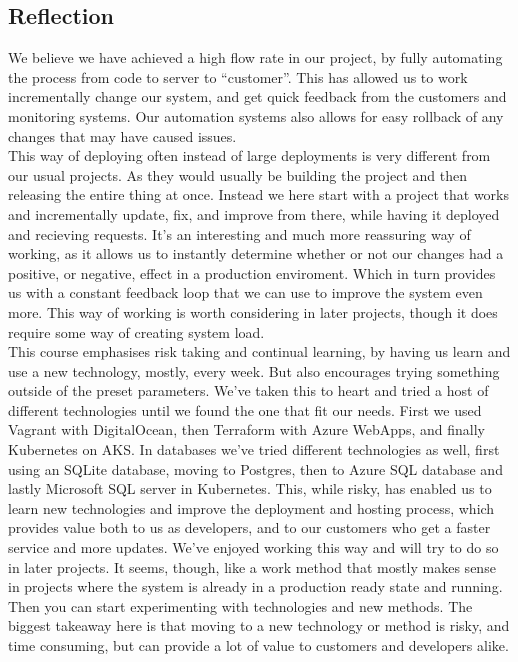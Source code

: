 \subsection{Reflection}
We believe we have achieved a high flow rate in our project, by fully automating the process from code to server to ``customer''.
This has allowed us to work incrementally change our system, and get quick feedback from the customers and monitoring systems.
Our automation systems also allows for easy rollback of any changes that may have caused issues.\\

This way of deploying often instead of large deployments is very different from our usual projects. As they would usually be building the project and then releasing the entire thing at once.
Instead we here start with a project that works and incrementally update, fix, and improve from there, while having it deployed and recieving requests.
It's an interesting and much more reassuring way of working, as it allows us to instantly determine whether or not our changes had a positive, or negative, effect in a production enviroment.
Which in turn provides us with a constant feedback loop that we can use to improve the system even more.
This way of working is worth considering in later projects, though it does require some way of creating system load.\\

This course emphasises risk taking and continual learning, by having us learn and use a new technology, mostly, every week.
But also encourages trying something outside of the preset parameters.
We've taken this to heart and tried a host of different technologies until we found the one that fit our needs. First we used Vagrant with DigitalOcean, then Terraform with Azure WebApps, and finally Kubernetes on AKS.
In databases we've tried different technologies as well, first using an SQLite database, moving to Postgres, then to Azure SQL database and lastly Microsoft SQL server in Kubernetes.
This, while risky, has enabled us to learn new technologies and improve the deployment and hosting process, which provides value both to us as developers, and to our customers who get a faster service and more updates.
We've enjoyed working this way and will try to do so in later projects.
It seems, though, like a work method that mostly makes sense in projects where the system is already in a production ready state and running.
Then you can start experimenting with technologies and new methods.
The biggest takeaway here is that moving to a new technology or method is risky, and time consuming, but can provide a lot of value to customers and developers alike.


